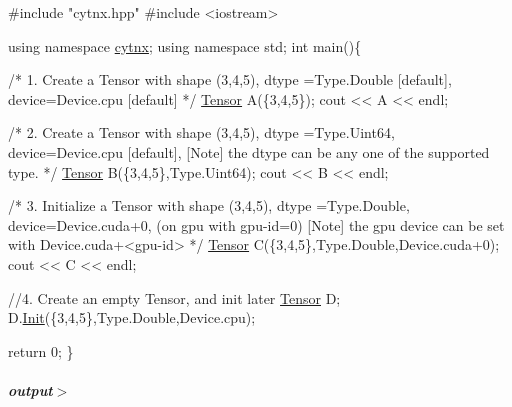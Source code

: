 \begin{DoxyCodeInclude}
\textcolor{preprocessor}{#include "cytnx.hpp"}
\textcolor{preprocessor}{#include <iostream>}


\textcolor{keyword}{using namespace }\hyperlink{namespacecytnx}{cytnx};
\textcolor{keyword}{using namespace }std;
\textcolor{keywordtype}{int} main()\{ 

    \textcolor{comment}{/*}
\textcolor{comment}{        1. Create a Tensor with }
\textcolor{comment}{        shape (3,4,5),}
\textcolor{comment}{        dtype =Type.Double [default],}
\textcolor{comment}{        device=Device.cpu [default]}
\textcolor{comment}{    */}
    \hyperlink{classcytnx_1_1Tensor}{Tensor} A(\{3,4,5\});
    cout << A << endl;

    \textcolor{comment}{/*}
\textcolor{comment}{        2. Create a Tensor with }
\textcolor{comment}{        shape (3,4,5),}
\textcolor{comment}{        dtype =Type.Uint64,}
\textcolor{comment}{        device=Device.cpu [default],}
\textcolor{comment}{        [Note] the dtype can be any one of the supported type.}
\textcolor{comment}{    */}
    \hyperlink{classcytnx_1_1Tensor}{Tensor} B(\{3,4,5\},Type.Uint64);
    cout << B << endl;

    \textcolor{comment}{/*}
\textcolor{comment}{        3. Initialize a Tensor with }
\textcolor{comment}{        shape (3,4,5),}
\textcolor{comment}{        dtype =Type.Double,}
\textcolor{comment}{        device=Device.cuda+0, (on gpu with gpu-id=0)}
\textcolor{comment}{        [Note] the gpu device can be set with Device.cuda+<gpu-id>}
\textcolor{comment}{    */}
    \hyperlink{classcytnx_1_1Tensor}{Tensor} C(\{3,4,5\},Type.Double,Device.cuda+0);
    cout << C << endl;

    \textcolor{comment}{//4. Create an empty Tensor, and init later}
    \hyperlink{classcytnx_1_1Tensor}{Tensor} D;
    D.\hyperlink{classcytnx_1_1Tensor_afdb4470e0dc934964d80aa9c761cca48}{Init}(\{3,4,5\},Type.Double,Device.cpu);

    \textcolor{keywordflow}{return} 0;
\}

\end{DoxyCodeInclude}
 \subparagraph*{output$>$}


